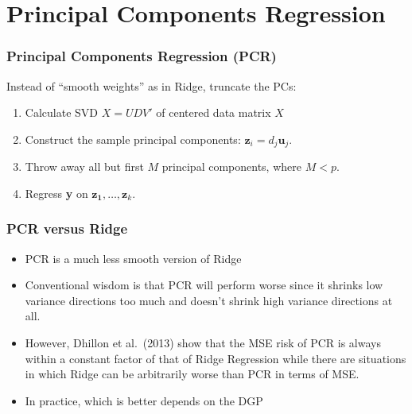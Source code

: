 \section{Principal Components Regression}
\begin{frame}
  \frametitle{Principal Components Regression (PCR)}

  \small

Instead of ``smooth weights'' as in Ridge, truncate the PCs:
	\begin{enumerate}
    \item Calculate SVD $X=UDV'$ of \alert{centered} data matrix $X$
		\item Construct the sample principal components: $\mathbf{z}_i = d_j \mathbf{u}_j$.
		\item Throw away all but first $M$ principal components, where $M <p$.
		\item Regress \textbf{y} on $\mathbf{z_1}, \hdots, \mathbf{z}_k$. 
	\end{enumerate}

\end{frame}
\begin{frame}
  \frametitle{PCR versus Ridge}
  \begin{itemize}
    \item PCR is a much less smooth version of Ridge
    \item Conventional wisdom is that PCR will perform worse since it shrinks low variance directions too much and doesn't shrink high variance directions at all.
  \item However, Dhillon et al.\ (2013) show that the MSE risk of PCR is always within a constant factor of that of Ridge Regression while there are situations in which Ridge can be arbitrarily worse than PCR in terms of MSE. 
    \item In practice, which is better depends on the DGP
  \end{itemize}
\end{frame}
